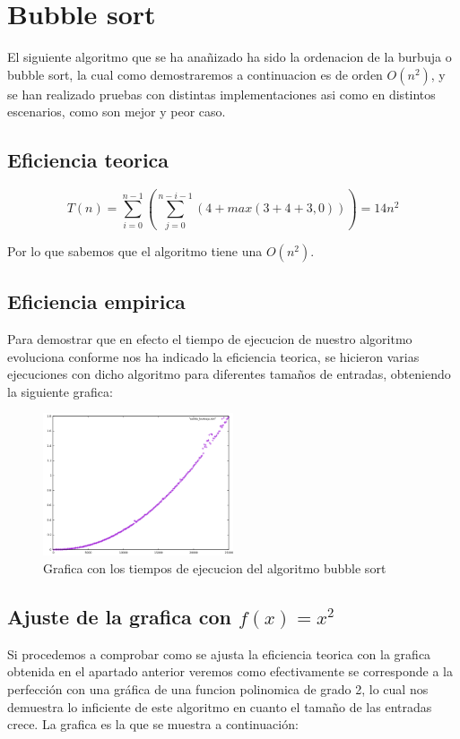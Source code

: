 \section{Bubble sort}
El siguiente algoritmo que se ha anañizado ha sido la ordenacion de la burbuja o bubble sort, la cual como demostraremos a continuacion es de orden $O(n^{2})$, y se han realizado pruebas con distintas implementaciones asi como en distintos escenarios, como son mejor y peor caso.

\subsection{Eficiencia teorica}

\begin{equation}
  T(n)=\sum_{i=0}^{n-1}(\sum_{j=0}^{n-i-1}(4+max(3+4+3,0)))=14n^{2}
\end{equation}

Por lo que sabemos que el algoritmo tiene una $O(n^{2})$.


\subsection{Eficiencia empirica}
Para demostrar que en efecto el tiempo de ejecucion de nuestro algoritmo evoluciona conforme nos ha indicado la eficiencia teorica, se hicieron varias ejecuciones con dicho algoritmo para diferentes tamaños de entradas, obteniendo la siguiente grafica:

\begin{figure}[H]
  \centering
  \includegraphics[width=0.5\textwidth]{./Imagenes/burbuja_pela.png}
  \caption{Grafica con los tiempos de ejecucion del algoritmo bubble sort}
\end{figure}


\subsection{Ajuste de la grafica con $f(x)=x^{2}$}
Si procedemos a comprobar como se ajusta la eficiencia teorica con la grafica obtenida en el apartado anterior veremos como efectivamente se corresponde a la perfección con una gráfica de una funcion polinomica de grado 2, lo cual nos demuestra lo inficiente de este algoritmo en cuanto el tamaño de las entradas crece. La grafica es la que se muestra a continuación:

